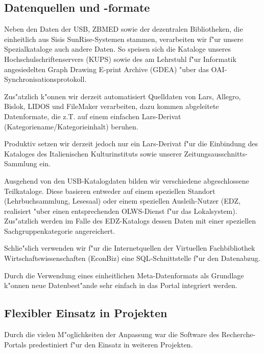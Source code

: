 \documentclass[11pt, twoside, a4paper, BCOR8mm, DIV12, bibtotoc,idxtotoc]{scrbook}
\begin{document}
\subsection{Datenquellen und -formate}
Neben den Daten der USB, ZBMED sowie der dezentralen Bibliotheken, die
einheitlich aus Sisis SunRise-Systemen stammen, verarbeiten wir f"ur
unsere Spezialkataloge auch andere Daten. So speisen sich die Kataloge unseres
Hochschulschriftenservers (KUPS) sowie des am Lehrstuhl f"ur Informatik
angesiedelten Graph Drawing E-print Archive (GDEA) "uber das
OAI-Syn\-chro\-ni\-sa\-tions\-pro\-to\-koll.

Zus"atzlich k"onnen wir derzeit automatisiert Quelldaten von Lars,
Allegro, Bislok, LIDOS und FileMaker verarbeiten, dazu kommen
abgeleitete Datenformate, die z.T. auf einem einfachen Lars-Derivat
(Kategoriename/Kategorieinhalt) beruhen.

Produktiv setzen wir derzeit jedoch nur ein Lars-Derivat f"ur die
Einbindung des Kataloges des Italienischen Kulturinstituts sowie
unserer Zeitungsausschnitts-Sammlung ein.


Ausgehend von den USB-Katalogdaten bilden wir verschiedene
abgeschlossene Teilkataloge. Diese basieren entweder auf einem
spe\-ziel\-len Standort (Lehrbuchsammlung, Lesesaal) oder einem spe\-ziel\-len
Ausleih-Nutzer (EDZ, realisiert "uber einen entsprechenden OLWS-Dienst
f"ur das Lokal\-sys\-tem). Zus"atzlich werden im Falle des EDZ-Katalogs
dessen Daten mit einer spe\-ziel\-len Sach\-gruppen\-ka\-te\-go\-rie angereichert.

Schlie"slich verwenden wir f"ur die Internetquellen der Virtuellen
Fachbibliothek Wirtschafts\-wissen\-schaften (EconBiz) eine
SQL-Schnittstelle f"ur den Datenabzug.

Durch die Verwendung eines einheitlichen Meta-Datenformats als
Grundlage k"onnen neue Daten\-be\-st"an\-de sehr einfach in das Portal
integriert werden.


\subsection{Flexibler Einsatz in Projekten}

Durch die vielen M"oglichkeiten der Anpassung war die Software des
Recherche-Portals predestiniert f"ur den Einsatz in weiteren
Projekten\cite{FlimmHoffJB:06}.
\end{document}
